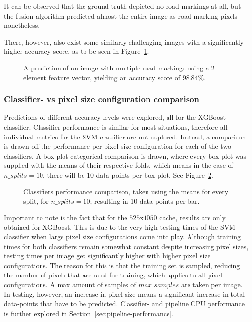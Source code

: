 It can be observed that the ground truth depicted no road markings at all, but the fusion algorithm predicted almost the entire image as road-marking pixels nonetheless.

There, however, also exist some similarly challenging images with a significantly higher accuracy score, as to be seen in Figure~\ref{fig:xgboost-prediction-high-acc}.

\begin{figure}[ht]
  \centering
  
  \caption{A prediction of an image with multiple road markings using a 2-element feature vector, yielding an accuracy score of $98.84\%$.
  }\label{fig:xgboost-prediction-high-acc}
\end{figure}

\subsubsection{Classifier- vs pixel size configuration comparison}
Predictions of different accuracy levels were explored, all for the XGBoost classifier. Classifier performance is similar for most situations, therefore all individual metrics for the SVM classifier are not explored. Instead, a comparison is drawn off the performance per-pixel size configuration for each of the two classifiers. A box-plot categorical comparison is drawn, where every box-plot was supplied with the means of their respective folds, which means in the case of $n\_splits = 10$, there will be 10 data-points per box-plot. See Figure~\ref{fig:classifiers-cache-perfomance}.

\begin{figure}[ht]
  \centering
  
  \caption{Classifiers performance comparison, taken using the means for every split, for $n\_splits = 10$; resulting in 10 data-points per bar. 
  }\label{fig:classifiers-cache-perfomance}
\end{figure}

Important to note is the fact that for the $525$x$1050$ cache, results are only obtained for XGBoost. This is due to the very high testing times of the SVM classifier when large pixel size configurations come into play. Although training times for both classifiers remain somewhat constant despite increasing pixel sizes, testing times per image get significantly higher with higher pixel size configurations. The reason for this is that the training set is sampled, reducing the number of pixels that are used for training, which applies to all pixel configurations. A max amount of samples of $max\_samples$ are taken per image. In testing, however, an increase in pixel size means a significant increase in total data-points that have to be predicted. Classifier- and pipeline CPU performance is further explored in Section~\ref{sec:pipeline-performance}.

